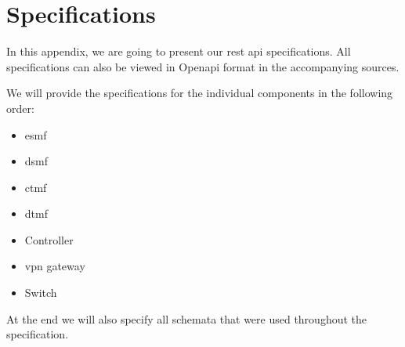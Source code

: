 \chapter{Specifications}
\label{specifications}

In this appendix, we are going to present our \acrshort{rest} \acrshort{api} specifications. All specifications can also be viewed in Open\acrshort{api} format in the accompanying sources.

We will provide the specifications for the individual components in the following order:

\begin{itemize}
    \item \acrshort{esmf}
    \item \acrshort{dsmf}
    \item \acrshort{ctmf}
    \item \acrshort{dtmf}
    \item Controller
    \item \acrshort{vpn} gateway
    \item Switch
\end{itemize}

At the end we will also specify all schemata that were used throughout the specification.

%
%
%
%
%
%
%